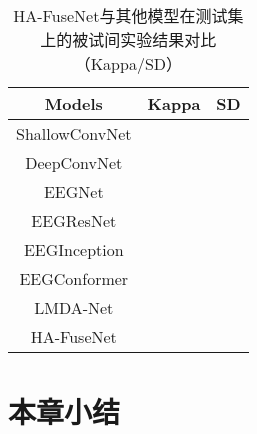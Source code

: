 \begin{table}[ht]
    \centering
    \caption{HA-FuseNet与其他模型在测试集上的被试间实验结果对比（Kappa/SD）}
    \label{tab:2bcomparecrosssd}
    \begin{tabularx}{\textwidth}{CCC}
      \toprule
      Models & Kappa & SD \\
      \midrule
      ShallowConvNet\cite{schirrmeister2017deep} \\
      DeepConvNet\cite{schirrmeister2017deep} \\
      EEGNet\cite{lawhern2018eegnet} \\
      EEGResNet\cite{HBM:HBM23730} \\
      EEGInception\cite{zhang2021eeg} \\
      EEGConformer\cite{song2022eeg} \\
      LMDA-Net\cite{miao2023lmda} \\
      \midrule 
      HA-FuseNet \\
      \bottomrule
    \end{tabularx}
\end{table}

\section{本章小结}

